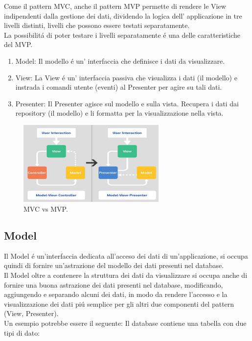 Come il pattern MVC, anche il pattern MVP permette di rendere le View indipendenti dalla gestione dei dati, dividendo la logica dell' applicazione in tre livelli distinti, livelli che possono essere testati separatamente.\\
La possibilit\'a di poter testare i livelli separatamente \'e una delle caratteristiche del MVP.\@


\begin{enumerate}
\item Model: Il modello \'e un' interfaccia che definisce i dati da visualizzare.
\item View: La View \'e un' interfaccia passiva che visualizza i dati (il modello) e instrada i comandi utente (eventi) al Presenter per agire su tali dati.
\item Presenter: Il Presenter agisce sul modello e sulla vista. Recupera i dati dai repository (il modello) e li formatta per la visualizzazione nella vista.
\end{enumerate}

\begin{figure}[!h]
  \centering
  \includegraphics[width=0.65\textwidth]{immagini/mvc-vs-mvp.jpg}
  \caption{MVC vs MVP.}\label{fig:MVC vs MVP}
\end{figure}

\newpage


\subsection{Model}
Il Model \'e un'interfaccia dedicata all'acceso dei dati di un'applicazione, si occupa quindi di fornire un'astrazione del modello dei dati presenti nel database.\\
Il Model oltre a contenere la struttura dei dati da visualizzare si occupa anche di fornire una buona astrazione dei dati presenti nel database, modificando, aggiungendo e separando alcuni dei dati, in modo da rendere l'accesso e la visualizzazione dei dati pi\'u semplice per gli altri due componenti del pattern (View, Presenter).\\
Un esempio potrebbe essere il seguente:
Il database contiene una tabella con due tipi di dato:

